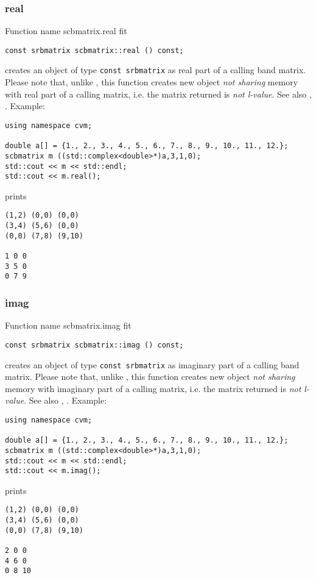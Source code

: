 \subsubsection{real}
Function%
\pdfdest name {scbmatrix.real} fit
\begin{verbatim}
const srbmatrix scbmatrix::real () const;
\end{verbatim}
creates an object of type \verb"const srbmatrix"
as  real part
of a calling band matrix.
Please note that, unlike
, this
function creates new object \emph{not sharing}  memory
with  real part of a calling matrix, i.e.
the matrix returned is \emph{not  l-value}.
See also
,
.
Example:
\begin{Verbatim}
using namespace cvm;

double a[] = {1., 2., 3., 4., 5., 6., 7., 8., 9., 10., 11., 12.};
scbmatrix m ((std::complex<double>*)a,3,1,0);
std::cout << m << std::endl;
std::cout << m.real();
\end{Verbatim}
prints
\begin{Verbatim}
(1,2) (0,0) (0,0)
(3,4) (5,6) (0,0)
(0,0) (7,8) (9,10)

1 0 0
3 5 0
0 7 9
\end{Verbatim}
\newpage




\subsubsection{imag}
Function%
\pdfdest name {scbmatrix.imag} fit
\begin{verbatim}
const srbmatrix scbmatrix::imag () const;
\end{verbatim}
creates an object of type \verb"const srbmatrix"
as imaginary part
of a calling band matrix.
Please note that, unlike
, this
function creates new object \emph{not sharing}  memory
with  imaginary part of a calling matrix, i.e.
the matrix returned is \emph{not  l-value}.
See also
,
.
Example:
\begin{Verbatim}
using namespace cvm;

double a[] = {1., 2., 3., 4., 5., 6., 7., 8., 9., 10., 11., 12.};
scbmatrix m ((std::complex<double>*)a,3,1,0);
std::cout << m << std::endl;
std::cout << m.imag();
\end{Verbatim}
prints
\begin{Verbatim}
(1,2) (0,0) (0,0)
(3,4) (5,6) (0,0)
(0,0) (7,8) (9,10)

2 0 0
4 6 0
0 8 10
\end{Verbatim}
\newpage



